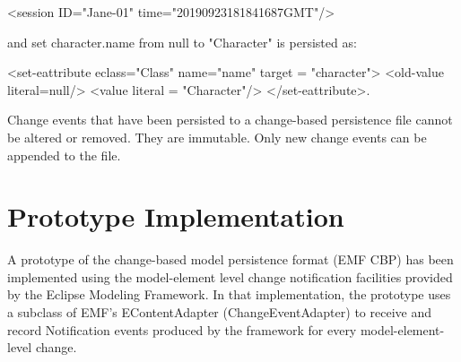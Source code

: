 \textsf{<session ID="Jane-01" time="20190923181841687GMT"/>}

and \textsf{set character.name from null to "Character"} is persisted as:

\textsf{<set-eattribute eclass="Class" name="name"
  target = "character">
  <old-value literal=null/>
  <value literal = "Character"/>
  </set-eattribute>}.

Change events that have been persisted to a change-based persistence file cannot be altered or removed. They are immutable. Only new change events can be appended to the file.


\section{Prototype Implementation}
\label{sec:prototype_implementation}

A prototype \cite{epsilonlabs2019emfcbp} of the change-based model persistence format (EMF CBP) has been implemented using the model-element level change notification facilities provided by the Eclipse Modeling Framework. In that implementation, the prototype uses a subclass of EMF’s \textsf{EContentAdapter} (\textsf{ChangeEventAdapter}) to receive and record \textsf{Notification} events produced by the framework for every model-element-level change.

